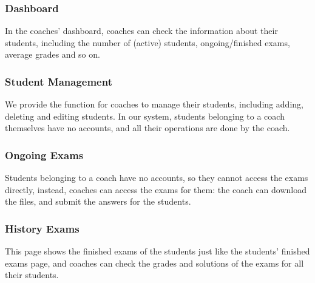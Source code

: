 \documentclass[12pt]{article}
\begin{document}
\subsubsection{Dashboard}
In the coaches' dashboard, coaches can check the information about their students, including the number of (active) students, ongoing/finished exams,
average grades and so on.
\subsubsection{Student Management}
We provide the function for coaches to manage their students, including adding, deleting and editing students.
In our system, students belonging to a coach themselves have no accounts, and all their operations are done by the coach.
\subsubsection{Ongoing Exams}
Students belonging to a coach have no accounts, so they cannot access the exams directly, instead, coaches can access the exams
for them: the coach can download the files, and submit the answers for the students.
\subsubsection{History Exams}
This page shows the finished exams of the students just like the students' finished exams page, and coaches can check the grades and solutions of the exams
for all their students.
\end{document}
